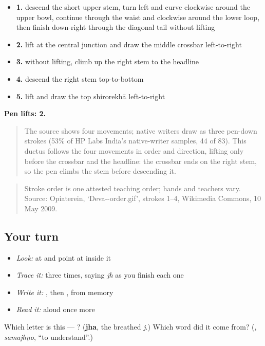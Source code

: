 \begin{itemize}
\raggedright
  \item \textbf{1.} descend the short upper stem, turn left and curve clockwise around the upper bowl, continue through the waist and clockwise around the lower loop, then finish down-right through the diagonal tail without lifting
  \item \textbf{2.} lift at the central junction and draw the middle crossbar left-to-right
  \item \textbf{3.} without lifting, climb up the right stem to the headline
  \item \textbf{4.} descend the right stem top-to-bottom
  \item \textbf{5.} lift and draw the top shirorekhā left-to-right
\end{itemize}

\textbf{Pen lifts: 2.}

\begin{quote}
The source shows four movements; native writers draw  as three pen-down strokes (53\% of HP Labs India's native-writer samples, 44 of 83). This ductus follows the four movements in order and direction, lifting only before the crossbar and the headline: the crossbar ends on the right stem, so the pen climbs the stem before descending it.
\end{quote}

\begin{quote}
Stroke order is one attested teaching order; hands and teachers vary. Source: Opiaterein, ‘Deva--order.gif’, strokes 1–4, Wikimedia Commons, 10 May 2009.
\end{quote}

\subsection*{Your turn}
\begin{itemize}
\raggedright
  \item \emph{Look:} at \textbf{} and point at  inside it
  \item \emph{Trace it:}  three times, saying \emph{jh} as you finish each one
  \item \emph{Write it:} , then , from memory
  \item \emph{Read it:} \textbf{} aloud once more
\end{itemize}

\begin{tcolorbox}[breakable,colback=teal!4,colframe=teal!35!black,title={Before you move on}]
Which letter is this — ? (\textbf{jha}, the breathed \emph{j}.) Which word did it come from? (\textbf{}, \emph{samajhṇo}, \textquotedblleft{}to understand\textquotedblright{}.)
\end{tcolorbox}
